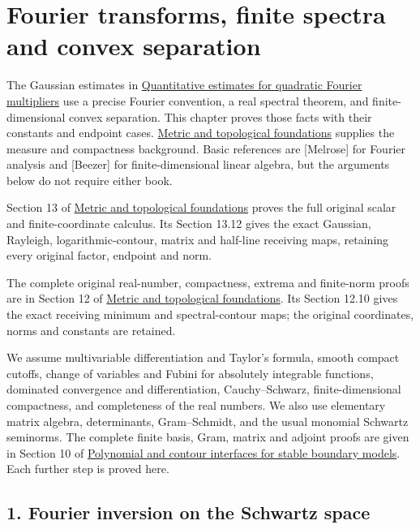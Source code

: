 \documentclass[
  11pt,
]{article}
\author{}
\date{}
\begin{document}
\section{Fourier transforms, finite spectra and convex
separation}\label{fourier-transforms-finite-spectra-and-convex-separation}

The Gaussian estimates in
\href{gauss-transform-estimates.pdf}{Quantitative estimates for quadratic
Fourier multipliers} use a precise Fourier convention, a real spectral
theorem, and finite-dimensional convex separation. This chapter proves
those facts with their constants and endpoint cases.
\href{metric-foundation-bridges.pdf}{Metric and topological foundations}
supplies the measure and compactness background. Basic references are
{[}Melrose{]} for Fourier analysis and {[}Beezer{]} for
finite-dimensional linear algebra, but the arguments below do not
require either book.

Section 13 of
\href{metric-foundation-bridges.pdf}{Metric
and topological foundations} proves the full original scalar and
finite-coordinate calculus. Its Section 13.12 gives the exact Gaussian,
Rayleigh, logarithmic-contour, matrix and half-line receiving maps,
retaining every original factor, endpoint and norm.

The complete original real-number, compactness, extrema and finite-norm
proofs are in Section 12 of
\href{metric-foundation-bridges.pdf}{Metric
and topological foundations}. Its Section 12.10 gives the exact
receiving minimum and spectral-contour maps; the original coordinates,
norms and constants are retained.

We assume multivariable differentiation and Taylor's formula, smooth
compact cutoffs, change of variables and Fubini for absolutely
integrable functions, dominated convergence and differentiation,
Cauchy--Schwarz, finite-dimensional compactness, and completeness of the
real numbers. We also use elementary matrix algebra, determinants,
Gram--Schmidt, and the usual monomial Schwartz seminorms. The complete
finite basis, Gram, matrix and adjoint proofs are given in Section 10 of
\href{stable-prerequisite-bridges.pdf}{Polynomial
and contour interfaces for stable boundary models}. Each further step is
proved here.

\subsection{1. Fourier inversion on the Schwartz
space}\label{fourier-inversion-on-the-schwartz-space}
\end{document}
